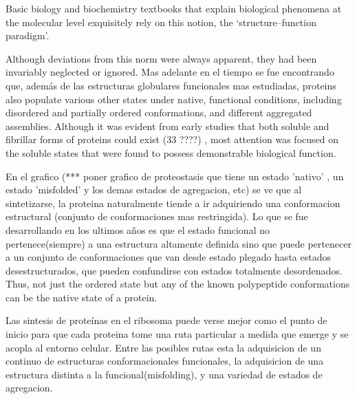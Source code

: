 Basic biology and biochemistry textbooks that explain biological phenomena at the molecular level exquisitely rely on this notion, the ‘structure–function paradigm’.

Although deviations from this norm were always apparent, they had been invariably neglected or ignored.
Mas adelante en el tiempo se fue encontrando que, además de las estructuras globulares funcionales mas estudiadas, proteins also populate various other states under native, functional conditions, including disordered and partially ordered conformations, and different aggregated assemblies.
Although it was evident from early studies that both soluble and fibrillar forms of proteins could exist (33 ????) , most attention was focused on the soluble states that were found to possess demonstrable biological function.




En el grafico (*** poner grafico de proteostasis que tiene un estado 'nativo' , un estado 'misfolded' y los demas estados de agregacion, etc) se ve que al sintetizarse, 
la proteina naturalmente tiende a ir adquiriendo una conformacion estructural (conjunto de conformaciones mas restringida).
Lo que se fue desarrollando en los ultimos años es que el estado funcional no pertenece(siempre) a una estructura altamente definida sino que puede pertenecer a un conjunto de conformaciones que van desde
estado plegado hasta estados desestructurados, que pueden confundirse con estados totalmente desordenados. 
Thus, not just the ordered state but any of the known polypeptide conformations can be the native state of a protein.

Las sintesis de proteínas en el ribosoma puede verse mejor como el punto de inicio para que cada proteina tome una ruta particular a medida que emerge y se acopla al entorno celular. 
Entre las posibles rutas esta la adquisicion de un continuo de estructuras conformacionales funcionales, la adquisicion de una estructura distinta a la funcional(misfolding), y una variedad de estados de agregacion.


